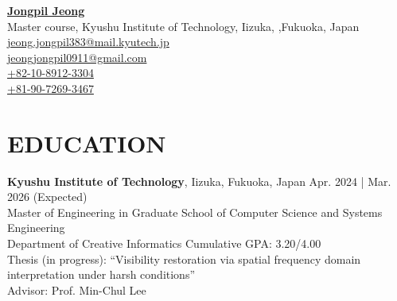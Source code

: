 \documentclass[a4paper,9pt]{extarticle}
\begin{document}
\pagestyle{fancy}
\renewcommand{\headrulewidth}{0pt}
\fancyhead{}
\thispagestyle{empty} %

\begin{flushleft}
\href{https://scholar.google.com/citations?user=O-3pYeQAAAAJ&hl=en}{\textbf{\LARGE Jongpil Jeong}}\\[2pt] %
Master course, Kyushu Institute of Technology, Iizuka, ,Fukuoka, Japan
\\ \href{mailto:jeong.jongpil383@mail.kyutech.jp}{jeong.jongpil383@mail.kyutech.jp} %
\\ \href{mailto:jeongjongpil0911@gmail.com}{jeongjongpil0911@gmail.com} %
\\ \href{tel:+82-10-8912-3304}{+82-10-8912-3304}
\\ \href{tel:+81-90-7269-3467}{+81-90-7269-3467}
\end{flushleft} 



\section*{EDUCATION}
\textbf{Kyushu Institute of Technology}, Iizuka, Fukuoka, Japan                         \hfill Apr. 2024 | Mar. 2026 (Expected)\\ %
Master of Engineering in Graduate School of Computer Science and Systems Engineering \\   
Department of Creative Informatics \hfill Cumulative GPA: 3.20/4.00 \\ %
Thesis (in progress): ``Visibility restoration via spatial frequency domain interpretation under harsh conditions''  \\
Advisor: Prof. Min-Chul Lee \\
\end{document}
